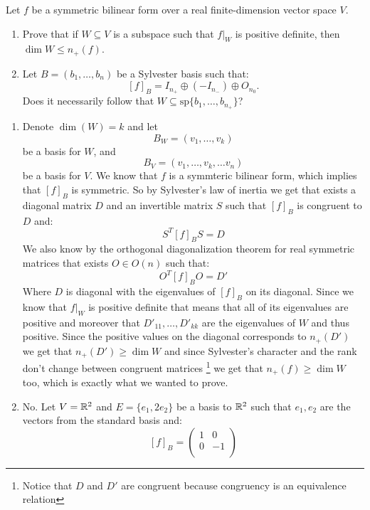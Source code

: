 \documentclass[11pt, a4paper]{article}
\begin{document}
\begin{exercise}
  Let $f$ be a symmetric bilinear form over a real finite-dimension vector 
  space $V$.
  \begin{enumerate}
    \item[(1)] Prove that if $W\subseteq V$ is a subspace such that $f\vert_W$ 
      is positive definite, then $\dim W \le n_{+}(f)$.
    \item[(2)] Let $B = (b_1,\dots,b_n)$ be a Sylvester basis such that:
      \[
        [f]_B = I_{n_{+}} \oplus (-I_{n_{-}}) \oplus O_{n_{0}}.
      \]
      Does it necessarily follow that 
      $W\subseteq \mathrm{sp}\{b_1,\dots,b_{n_{+}}\}$?
  \end{enumerate}
\end{exercise}
\begin{solution} \phantom{}
\begin{enumerate}
  \item[(1)]
  Denote $\dim (W) = k$ and
  let
  \[
    B_W = (v_1,\dots,v_{k})
  \]
  be a basis for $W$, and
  \[
    B_V = (v_1,\dots,v_{k},\dots v_n)
  \]
  be a basis for $V$.
  We know that $f$ is a symmteric bilinear form, which implies that $[f]_B$ is 
  symmetric. So by Sylvester's law of inertia we get that exists a diagonal 
  matrix $D$ and an invertible matrix $S$ such that $[f]_B$ is congruent to $D$ 
  and:
  \[
    S^{T}[f]_BS = D
  \]
  We also know by the orthogonal diagonalization theorem for real symmetric
  matrices that exists $O\in O(n)$ such that:
  \[
    O^{T}[f]_BO = D'
  \]
  Where $D$ is diagonal with the eigenvalues of $[f]_B$ on its diagonal.
  Since we know that $f\vert_W$ is positive definite that means that all
  of its eigenvalues are positive and moreover that $D'_{11},\dots,D'_{kk}$
  are the eigenvalues of $W$ and thus positive.
  Since the positive values on the diagonal corresponds to $n_+(D')$
  we get that $n_+(D') \geq \dim W$ and since Sylvester's character
  and the rank don't change between congruent matrices
  \footnote{Notice that $D$ and $D'$ are congruent because congruency
  is an equivalence relation} 
  we get that
  $n_+(f) \geq \dim W$ too, which is exactly what we wanted to prove.
\item[(2)]
  No. Let $V = \mathbb{R}^2$ and $E = \{e_1,2e_2\}$ be a basis to $\mathbb{R}^2$ such that
  $e_1,e_2$ are the vectors from the standard basis and:
  \[
    [f]_B = 
    \begin{pmatrix}
      1 & 0 \\
      0 & -1 \\
    \end{pmatrix}
\]
\end{enumerate}
\end{solution}
\end{document}
